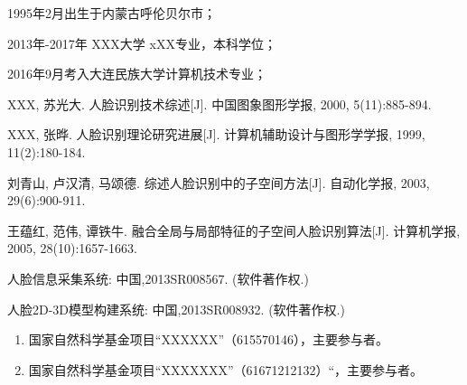 \begin{resume}

%
1995年2月出生于内蒙古呼伦贝尔市；

%
2013年-2017年  XXX大学  xXX专业，本科学位；

2016年9月考入大连民族大学计算机技术专业；
%  



\begin{enumerate}[{[}1{]}]  

\item XXX, 苏光大. 人脸识别技术综述[J]. 中国图象图形学报, 2000, 5(11):885-894.
  

  
\item XXX, 张晔. 人脸识别理论研究进展[J]. 计算机辅助设计与图形学学报, 1999, 11(2):180-184.

\end{enumerate}
\begin{enumerate}[{[}1{]}]

\item  刘青山, 卢汉清, 马颂德. 综述人脸识别中的子空间方法[J]. 自动化学报, 2003, 29(6):900-911.

\item 王蕴红, 范伟, 谭铁牛. 融合全局与局部特征的子空间人脸识别算法[J]. 计算机学报, 2005, 28(10):1657-1663.


\end{enumerate}

  \begin{enumerate}[{[}1{]}]
  \item 人脸信息采集系统: 中国,2013SR008567. (软件著作权.)
  \item  人脸2D-3D模型构建系统: 中国,2013SR008932. (软件著作权.)
  \end{enumerate}
  
  
\begin{enumerate}
\item 国家自然科学基金项目“XXXXXX”（615570146），主要参与者。

\item 国家自然科学基金项目``XXXXXXX”（61671212132）“，主要参与者。
\end{enumerate}

\quad

\end{resume}
